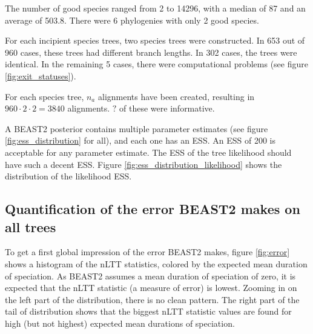 \documentclass{article}
\begin{document}
The number of good species ranged from 2 to 14296, with a median of 87 and an average of 503.8. 
There were 6 phylogenies with only 2 good species.  



For each incipient species trees, two species trees were constructed. 
In 653 out of 960 cases, these trees had different branch lengths.
In 302 cases, the trees were identical. In the remaining 5 cases,
there were computational problems (see figure \ref{fig:exit_statuses}).



For each species tree, $n_a$ alignments have been created, 
resulting in $960 \cdot 2 \cdot 2 = 3840$ alignments. 
$?$ of these were informative.



A BEAST2 posterior contains multiple parameter estimates (see figure \ref{fig:ess_distribution} for all),
and each one has an ESS. An ESS of 200 is acceptable for any parameter estimate.
The ESS of the tree likelihood should have such a decent ESS. Figure \ref{fig:ess_distribution_likelihood}
shows the distribution of the likelihood ESS.


\subsection{Quantification of the error BEAST2 makes on all trees}

To get a first global impression of the error BEAST2 makes, figure \ref{fig:error}
shows a histogram of the nLTT statistics, colored by the expected mean
duration of speciation. As BEAST2 assumes a mean duration of speciation of zero,
it is expected that the nLTT statistic (a measure of error) is lowest. Zooming
in on the left part of the distribution, there is no clean pattern.
The right part of the tail of distribution shows that the biggest nLTT
statistic values are found for high (but not highest) expected mean durations of
speciation.
\end{document}
